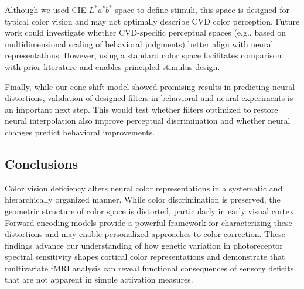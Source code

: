Although we used CIE $L^*a^*b^*$ space to define stimuli, this space is designed for typical color vision and may not optimally describe CVD color perception. Future work could investigate whether CVD-specific perceptual spaces (e.g., based on multidimensional scaling of behavioral judgments) better align with neural representations. However, using a standard color space facilitates comparison with prior literature and enables principled stimulus design.

Finally, while our cone-shift model showed promising results in predicting neural distortions, validation of designed filters in behavioral and neural experiments is an important next step. This would test whether filters optimized to restore neural interpolation also improve perceptual discrimination and whether neural changes predict behavioral improvements.

\subsection{Conclusions}

Color vision deficiency alters neural color representations in a systematic and hierarchically organized manner. While color discrimination is preserved, the geometric structure of color space is distorted, particularly in early visual cortex. Forward encoding models provide a powerful framework for characterizing these distortions and may enable personalized approaches to color correction. These findings advance our understanding of how genetic variation in photoreceptor spectral sensitivity shapes cortical color representations and demonstrate that multivariate fMRI analysis can reveal functional consequences of sensory deficits that are not apparent in simple activation measures.
